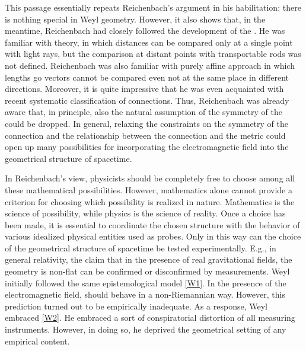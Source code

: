 \documentclass[final]{article}
\newcommand{\WG}{Weyl geometry\xspace}
\begin{document}
%
This passage essentially repeats Reichenbach's argument in his habilitation: there is nothing special in \WG. However, it also shows that, in the meantime, Reichenbach had closely followed the development of the \uftp. He was familiar with   theory, in which distances can be compared only at a single point with light rays, but the comparison at distant points with transportable rods was not defined. Reichenbach was also familiar with  purely affine approach in which lengths go vectors cannot be compared even not at the same place in different directions. Moreover, it is quite impressive that he was even acquainted with  recent systematic classification of connections. Thus, Reichenbach was already aware that, in principle, also the natural assumption of the symmetry of the \Gtmn could be dropped. In general, relaxing the constraints on the symmetry of the connection and the relationship between the connection and the metric could open up many possibilities for incorporating the electromagnetic field into the geometrical structure of spacetime. 

In Reichenbach's view, physicists should be completely free to choose among all these mathematical possibilities. However, mathematics alone cannot provide a criterion for choosing which possibility is realized in nature. Mathematics is the science of possibility, while physics is the science of reality. Once a choice has been made, it is essential to coordinate the chosen structure with the behavior of various idealized physical entities used as probes. Only in this way can the choice of the geometrical structure of spacetime be tested experimentally. E.g., in general relativity, the claim that in the presence of real gravitational fields, the \spti geometry is non-flat can be confirmed or disconfirmed by \rach measurements. Weyl initially followed the same epistemological model  \ref{W1}. In the presence of the electromagnetic field, \rac should behave in a non-Riemannian way. However, this prediction turned out to be empirically inadequate. As a response, Weyl embraced \ref{W2}. He embraced a sort of conspiratorial distortion of all measuring instruments. However, in doing so, he deprived the geometrical setting of any empirical content.
\end{document}
